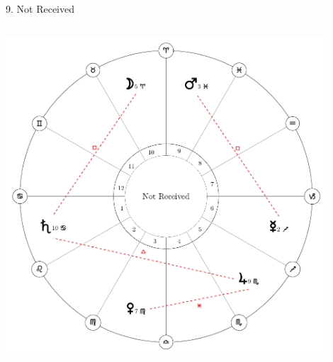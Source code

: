 \begin{frame}[t]{9. Not Received}
\begin{columns}[T, onlytextwidth]
\begin{center}
{\includegraphics[width=0.9\textwidth]{charts/66-not-received}} \\
\end{center}
\end{columns}
\end{frame}
